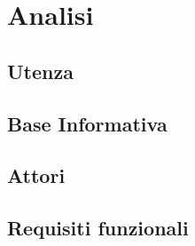 \section{Analisi}
    \subsection{Utenza}
    \subsection{Base Informativa}
    \subsection{Attori}
    \subsection{Requisiti funzionali}

